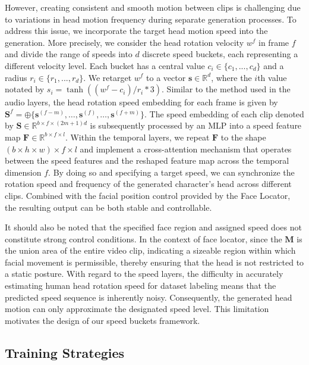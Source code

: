 However, creating consistent and smooth motion between clips is challenging due to variations in head motion frequency during separate generation processes. To address this issue, we incorporate the target head motion speed into the generation. More precisely, we consider the head rotation velocity $w^f$ in frame $f$ and divide the range of speeds into $d$ discrete speed buckets, each representing a different velocity level. Each bucket has a central value $c_i\in \{c_1,...,c_d\}$ and a radius $r_i \in \{r_1, ..., r_d\}$. We retarget $w^f$ to a vector $\mathbf{s}\in \mathbb{R}^d$, where the $i$th value notated by $s_i = \tanh((w^f-c_i)/r_i*3)$.
Similar to the method used in the audio layers, the head rotation speed embedding for each frame is given by $\mathbf{S}^{f}=\oplus\{\mathbf{s}^{(f-m)},\ldots,\mathbf{s}^{(f)},\ldots,\mathbf{s}^{(f+m)}\}$. The speed embedding of each clip denoted by $\mathbf{S}\in\mathbb{R}^{b\times f \times (2m+1)d}$ is subsequently processed by an MLP into a speed feature map $\mathbf{F}\in\mathbb{R}^{b\times f\times l}$. Within the temporal layers, we repeat $\mathbf{F}$ to the shape ${(b \times h \times w) \times f \times l}$ and implement a cross-attention mechanism that operates between the speed features and the reshaped feature map across the temporal dimension $f$. By doing so and specifying a target speed, we can synchronize the rotation speed and frequency of the generated character's head across different clips. Combined with the facial position control provided by the Face Locator, the resulting output can be both stable and controllable.


It should also be noted that the specified face region and assigned speed does not constitute strong control conditions. In the context of face locator, since the $\mathbf{M}$ is the union area of the entire video clip, indicating a sizeable region within which facial movement is permissible, thereby ensuring that the head is not restricted to a static posture. With regard to the speed layers, the difficulty in accurately estimating human head rotation speed for dataset labeling means that the predicted speed sequence is inherently noisy. Consequently, the generated head motion can only approximate the designated speed level. This limitation motivates the design of our speed buckets framework. 


\subsection{Training Strategies}

